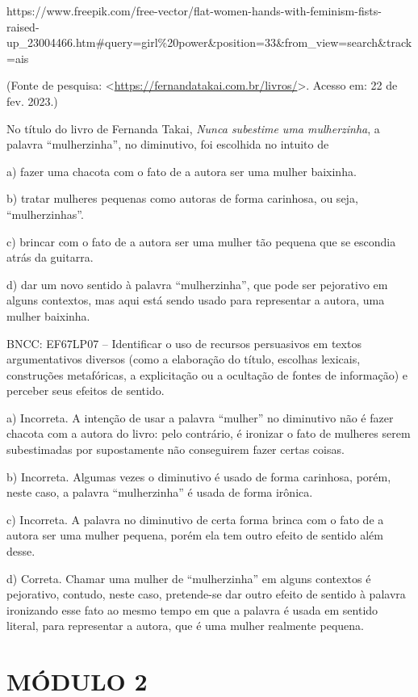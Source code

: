 {https://www.freepik.com/free-vector/flat-women-hands-with-feminism-fists-raised-up\_23004466.htm\#query=girl\%20power\&position=33\&from\_view=search\&track=ais

(Fonte de pesquisa:
\textless{}\url{https://fernandatakai.com.br/livros/}\textgreater.
Acesso em: 22 de fev. 2023.)

No título do livro de Fernanda Takai, \emph{Nunca subestime uma
mulherzinha}, a palavra ``mulherzinha'', no diminutivo, foi escolhida no
intuito de

a) fazer uma chacota com o fato de a autora ser uma mulher baixinha.

b) tratar mulheres pequenas como autoras de forma carinhosa, ou seja,
``mulherzinhas''.

c) brincar com o fato de a autora ser uma mulher tão pequena que se
escondia atrás da guitarra.

d) dar um novo sentido à palavra ``mulherzinha'', que pode ser
pejorativo em alguns contextos, mas aqui está sendo usado para
representar a autora, uma mulher baixinha.

BNCC: EF67LP07 -- Identificar o uso de recursos persuasivos em textos
argumentativos diversos (como a elaboração do título, escolhas lexicais,
construções metafóricas, a explicitação ou a ocultação de fontes de
informação) e perceber seus efeitos de sentido.

a) Incorreta. A intenção de usar a palavra ``mulher'' no diminutivo não
é fazer chacota com a autora do livro: pelo contrário, é ironizar o fato
de mulheres serem subestimadas por supostamente não conseguirem fazer
certas coisas.

b) Incorreta. Algumas vezes o diminutivo é usado de forma carinhosa,
porém, neste caso, a palavra ``mulherzinha'' é usada de forma irônica.

c) Incorreta. A palavra no diminutivo de certa forma brinca com o fato
de a autora ser uma mulher pequena, porém ela tem outro efeito de
sentido além desse.

d) Correta. Chamar uma mulher de ``mulherzinha'' em alguns contextos é
pejorativo, contudo, neste caso, pretende-se dar outro efeito de sentido
à palavra ironizando esse fato ao mesmo tempo em que a palavra é usada
em sentido literal, para representar a autora, que é uma mulher
realmente pequena.

\section{MÓDULO 2}

}
